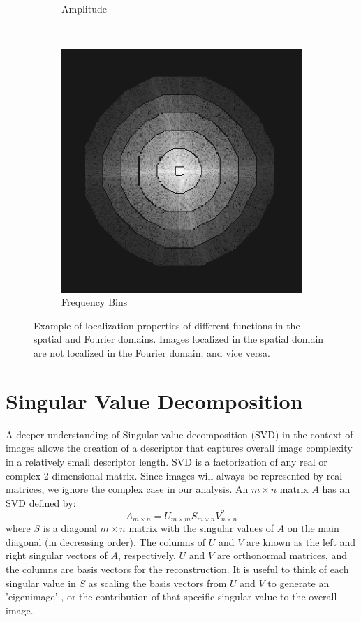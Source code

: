 \documentclass{report}
\begin{document}
\begin{figure}[H]
\begin{subfigure}[b]{0.2\textwidth}
                \caption{Amplitude}
                \label{fig:tiger}
        \end{subfigure}
        ~
        \begin{subfigure}[b]{0.2\textwidth}
                \includegraphics[width=\textwidth]{graphics/freq_bins.png}
                \caption{Frequency Bins}
                \label{fig:mouse}
        \end{subfigure}
        \caption{Example of localization properties of different functions in the spatial and Fourier domains. Images localized in the spatial domain are not localized in the Fourier domain, and vice versa.}\label{fig:fft_localization}
\end{figure}


\section{Singular Value Decomposition}
A deeper understanding of Singular value decomposition (SVD) in the context of images allows the creation of a descriptor that captures overall image complexity in a relatively small descriptor length. SVD is a factorization of any real or complex 2-dimensional matrix. Since images will always be represented by real matrices, we ignore the complex case in our analysis. An $m \times n$ matrix $A$ has an SVD defined by:
$$A_{\scriptscriptstyle m \times n} = U_{\scriptscriptstyle m \times m}S_{\scriptscriptstyle m \times n}V_{\scriptscriptstyle n \times n}^T$$
where $S$ is a diagonal $m \times n$ matrix with the singular values of $A$ on the main diagonal (in decreasing order). The columns of $U$ and $V$ are known as the left and right singular vectors of $A$, respectively. $U$ and $V$ are orthonormal matrices, and the columns are basis vectors for the reconstruction. It is useful to think of each singular value in $S$ as scaling the basis vectors from $U$ and $V$ to generate an 'eigenimage' \cite{svd_image_coding}, or the contribution of that specific singular value to the overall image.
\end{document}
